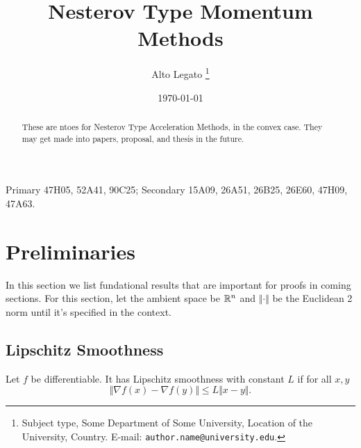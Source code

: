\documentclass[12pt]{article}
\begin{document}
\title{{\selectfont Nesterov Type Momentum Methods}}

\author{
    Alto Legato
    \thanks{
        Subject type, Some Department of Some University, Location of the University,
        Country. E-mail: \texttt{author.name@university.edu}.
    }
}

\date{\today}

\maketitle


\begin{abstract} 
    \noindent
    These are ntoes for Nesterov Type Acceleration Methods, in the convex case. 
    They may get made into papers, proposal, and thesis in the future. 
\end{abstract}
Primary 47H05, 52A41, 90C25; Secondary 15A09, 26A51, 26B25, 26E60, 47H09, 47A63.

\section{Preliminaries}
    In this section we list fundational results that are important for proofs in coming sections. 
    For this section, let the ambient space be $\mathbb R^n$ and $\Vert \cdot\Vert$ be the Euclidean 2 norm until it's specified in the context. 
    \subsection{Lipschitz Smoothness}
        \begin{definition}
            Let $f$ be differentiable. 
            It has Lipschitz smoothness with constant $L$ if for all $x, y$
            $$
                \Vert \nabla f(x) - \nabla f(y)\Vert 
                \le 
                L \Vert x - y\Vert. 
            $$    
        \end{definition}
\end{document}

